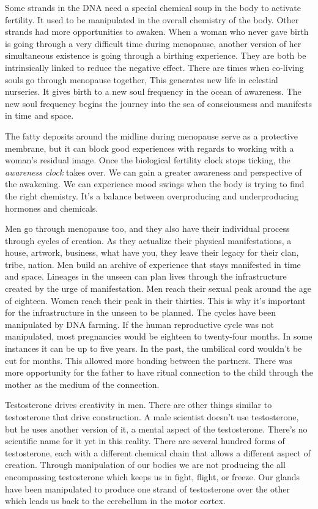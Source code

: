 \documentclass[letterpaper,9pt,twoside,titlepage,onecolumn,openany]{book}
\begin{document}
Some strands in the DNA need a special chemical soup in the body to
activate fertility. It used to be manipulated in the overall chemistry
of the body. Other strands had more opportunities to awaken. When a
woman who never gave birth is going through a very difficult time during
menopause, another version of her simultaneous existence is going
through a birthing experience. They are both be intrinsically linked to
reduce the negative effect. There are times when co-living souls go
through menopause together, This generates new life in celestial
nurseries. It gives birth to a new soul frequency in the ocean of
awareness. The new soul frequency begins the journey into the sea of
consciousness and manifests in time and space.

The fatty deposits around the midline during menopause serve as a
protective membrane, but it can block good experiences with regards to
working with a woman's residual image. Once the biological fertility
clock stops ticking, the \emph{awareness clock} takes over. We can gain
a greater awareness and perspective of the awakening. We can experience
mood swings when the body is trying to find the right chemistry. It's a
balance between overproducing and underproducing hormones and chemicals.

Men go through menopause too, and they also have their individual
process through cycles of creation. As they actualize their physical
manifestations, a house, artwork, business, what have you, they leave
their legacy for their clan, tribe, nation. Men build an archive of
experience that stays manifested in time and space. Lineages in the
unseen can plan lives through the infrastructure created by the urge of
manifestation. Men reach their sexual peak around the age of eighteen.
Women reach their peak in their thirties. This is why it's important for
the infrastructure in the unseen to be planned. The cycles have been
manipulated by DNA farming. If the human reproductive cycle was not
manipulated, most pregnancies would be eighteen to twenty-four months.
In some instances it can be up to five years. In the past, the umbilical
cord wouldn't be cut for months. This allowed more bonding between the
partners. There was more opportunity for the father to have ritual
connection to the child through the mother as the medium of the
connection.

Testosterone drives creativity in men. There are other things similar to
testosterone that drive construction. A male scientist doesn't use
testosterone, but he uses another version of it, a mental aspect of the
testosterone. There's no scientific name for it yet in this reality.
There are several hundred forms of testosterone, each with a different
chemical chain that allows a different aspect of creation. Through
manipulation of our bodies we are not producing the all encompassing
testosterone which keeps us in fight, flight, or freeze. Our glands have
been manipulated to produce one strand of testosterone over the other
which leads us back to the cerebellum in the motor cortex.
\end{document}
